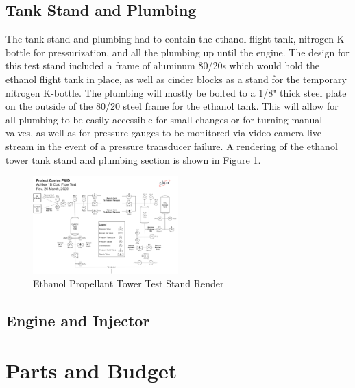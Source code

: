 \documentclass[9pt]{article} %
\numberwithin{equation}{section} %
\begin{document}
\subsection{Tank Stand and Plumbing}
\hspace{\parindent} The tank stand and plumbing had to contain the ethanol flight tank, nitrogen K-bottle for pressurization, and all the plumbing up until the engine. The design for this test stand included a frame of aluminum 80/20s which would hold the ethanol flight tank in place, as well as cinder blocks as a stand for the temporary nitrogen K-bottle. The plumbing will mostly be bolted to a 1/8" thick steel plate on the outside of the 80/20 steel frame for the ethanol tank. This will allow for all plumbing to be easily accessible for small changes or for turning manual valves, as well as for pressure gauges to be monitored via video camera live stream in the event of a pressure transducer failure. A rendering of the ethanol tower tank stand and plumbing section is shown in Figure \ref{fig:ethanol_tank_stand_render}.

\begin{figure}[!htb] 
    \centering
    \includegraphics[scale=0.5, width=0.5\textwidth]{pid} %
    \caption{Ethanol Propellant Tower Test Stand Render}
    \label{fig:ethanol_tank_stand_render}
\end{figure}

\subsection{Engine and Injector}

\section{Parts and Budget}


\printbibliography
\end{document}
